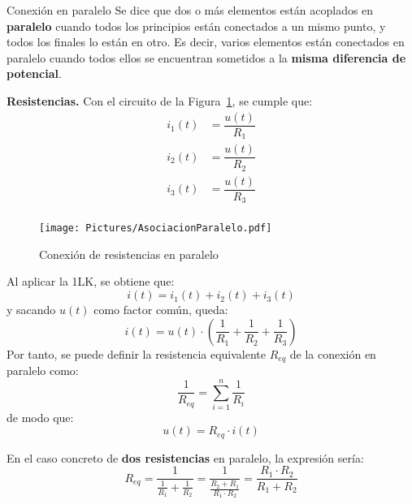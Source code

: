 \documentclass[11pt]{book} %
\makeatletter
\numberwithin{dummy}{section}
\theoremstyle{ocrenumbox}
\theoremstyle{blacknumex}
\theoremstyle{blacknumbox}
\theoremstyle{ocrenum}
\newenvironment{remark}{\par\vspace{10pt}\small %
\begin{list}{}{
\leftmargin=35pt %
\rightmargin=25pt}\item\ignorespaces %
\makebox[-2.5pt]{\begin{tikzpicture}[overlay]
\node[draw=ocre!60,line width=1pt,circle,fill=ocre!25,font=\sffamily\bfseries,inner sep=2pt,outer sep=0pt] at (-15pt,0pt){\textcolor{ocre}{N}};\end{tikzpicture}} %
\advance\baselineskip -1pt}{\end{list}\vskip5pt} %
\renewcommand{\subsubsection}{\@startsection {subsubsection}{3}{\z@}
{-2ex \@plus -0.1ex \@minus -.2ex}
{.2ex \@plus.2ex }
{\normalfont\small\sffamily\bfseries}}
\newlength\esp
\makeatother
\begin{document}
	\subsubsection{Conexión en paralelo}
	Se dice que dos o más elementos están acoplados en \textbf{paralelo} cuando todos los principios están conectados a un mismo punto, y todos los finales lo están en otro. Es decir, varios elementos están conectados en paralelo cuando todos ellos se encuentran sometidos a la \textbf{misma diferencia de potencial}.
	
	\begin{itemize}
		\item \textbf{Resistencias.} Con el circuito de la Figura~\ref{fig.resistencias-paralelo}, se cumple que:
		\begin{align*}
			i_1(t) &= \dfrac{u(t)}{R_1}\\
			i_2(t) &= \dfrac{u(t)}{R_2}\\
			i_3(t) &= \dfrac{u(t)}{R_3}\\
		\end{align*}
		\begin{figure}[tbp]
			\centering
			\texttt{[image: Pictures/AsociacionParalelo.pdf]}
			\caption{Conexión de resistencias en paralelo}
			\label{fig.resistencias-paralelo}
		\end{figure}
		Al aplicar la 1LK, se obtiene que: 
		\begin{equation*}
			i(t) = i_1(t) + i_2(t) + i_3(t)
		\end{equation*}
		y sacando $u(t)$ como factor común, queda:
		\begin{equation*}
			i(t) = u(t) \cdot \left(\frac{1}{R_1} + \frac{1}{R_2} + \frac{1}{R_3}\right)
		\end{equation*}
		Por tanto, se puede definir la resistencia equivalente $R_{eq}$ de la conexión en paralelo como:
		\begin{equation}
			\boxed{\dfrac{1}{R_{eq}} = \sum_{i = 1}^n \dfrac{1}{R_i}}
		\end{equation}
		de modo que:
		\begin{equation*}
			u(t) = R_{eq} \cdot i(t)
		\end{equation*}
		
		\begin{remark}
			En el caso concreto de \textbf{dos resistencias} en paralelo, la expresión sería: 
			\begin{equation*}
				R_{eq}=\dfrac{1}{\frac{1}{R_1}+\frac{1}{R_2}}=\dfrac{1}{\frac{R_2+R_1}{R_1\cdot R_2}}=\dfrac{R_1\cdot R_2}{R_1+R_2}
			\end{equation*}
		\end{remark}
		

\end{itemize}
\end{document}

